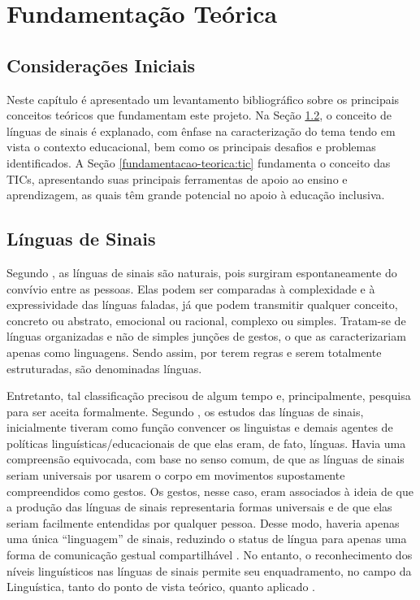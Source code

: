 \chapter{Fundamentação Teórica}
\label{chapter:fundamentacao-teorica}

\section{Considerações Iniciais}
\label{fundamentacao-teorica:inicio}

Neste capítulo é apresentado um levantamento bibliográfico sobre os principais conceitos teóricos que fundamentam este projeto. Na Seção \ref{fundamentacao-teorica:linguas-sinais}, o conceito de línguas de sinais é explanado, com ênfase na caracterização do tema tendo em vista o contexto educacional, bem como os principais desafios e problemas identificados. A Seção \ref{fundamentacao-teorica:tic} fundamenta o conceito das TICs, apresentando suas principais ferramentas de apoio ao ensino e aprendizagem, as quais têm grande potencial no apoio à educação inclusiva.

\section{Línguas de Sinais}
\label{fundamentacao-teorica:linguas-sinais}

Segundo , as línguas de sinais são naturais, pois surgiram espontaneamente do convívio entre as pessoas. Elas podem ser comparadas à complexidade e à expressividade das línguas faladas, já que podem transmitir qualquer conceito, concreto ou abstrato, emocional ou racional, complexo ou simples. Tratam-se de línguas organizadas e não de simples junções de gestos, o que as caracterizariam apenas como linguagens. Sendo assim, por terem regras e serem totalmente estruturadas, são denominadas línguas.

Entretanto, tal classificação precisou de algum tempo e, principalmente, pesquisa para ser aceita formalmente. Segundo , os estudos das línguas de sinais, inicialmente tiveram como função convencer os linguistas e demais agentes de políticas linguísticas/educacionais de que elas eram, de fato, línguas. Havia uma compreensão equivocada, com base no senso comum, de que as línguas de sinais seriam universais por usarem o corpo em movimentos supostamente compreendidos como gestos. Os gestos, nesse caso, eram associados à ideia de que a produção das línguas de sinais representaria formas universais e de que elas seriam facilmente entendidas por qualquer pessoa. Desse modo, haveria apenas uma única ``linguagem'' de sinais, reduzindo o status de língua para apenas uma forma de comunicação gestual compartilhável \cite{Quadros2004}. No entanto, o reconhecimento dos níveis linguísticos nas línguas de sinais permite seu enquadramento, no campo da Linguística, tanto do ponto de vista teórico, quanto aplicado \cite{Quadros2019}.

